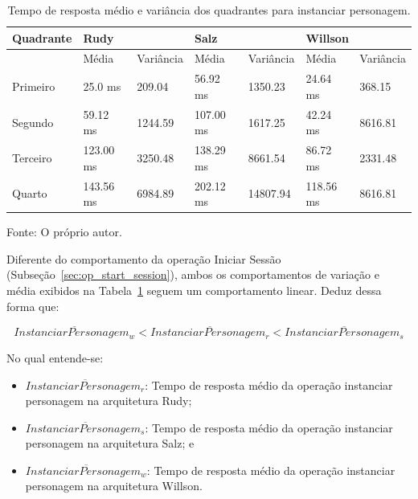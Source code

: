 \begin{table}[htb!]
\centering
\begin{adjustbox}{max width=\textwidth}
\caption{Tempo de resposta médio e variância dos quadrantes para instanciar personagem.}
\label{tab:op_spawn_character}
\begin{tabular}{l||l|l||l|l||l|l}

\hline \hline

Quadrante & \multicolumn{2}{l||}{Rudy}    & \multicolumn{2}{l||}{Salz}    & \multicolumn{2}{l}{Willson} \\ \hline \hline

& Média & Variância & Média & Variância & Média & Variância \\ \hline

Primeiro  & 25.0 ms & 209.04 & 56.92 ms & 1350.23 & 24.64 ms & 368.15 \\ \hline

Segundo  & 59.12 ms & 1244.59 & 107.00 ms & 1617.25 & 42.24 ms & 8616.81 \\ \hline

Terceiro  & 123.00 ms & 3250.48 & 138.29 ms & 8661.54 & 86.72 ms & 2331.48 \\ \hline

Quarto  & 143.56 ms & 6984.89 & 202.12 ms & 14807.94 & 118.56 ms & 8616.81 \\ \hline \hline

\end{tabular}

\end{adjustbox}

Fonte: O próprio autor.
\end{table}

Diferente do comportamento da operação Iniciar Sessão (Subseção~\ref{sec:op_start_session}), ambos os comportamentos de variação e média exibidos na Tabela~\ref{tab:op_spawn_character} seguem um comportamento linear.
%
Deduz dessa forma que:

$$
  \overline{InstanciarPersonagem_{w}} < \overline{InstanciarPersonagem_{r}} <\overline{InstanciarPersonagem_{s}}
$$

No qual entende-se:

\begin{itemize}
 \item $\overline{InstanciarPersonagem_{r}}$: Tempo de resposta médio da operação instanciar personagem na arquitetura Rudy;
 \item $\overline{InstanciarPersonagem_{s}}$: Tempo de resposta médio da operação instanciar personagem na arquitetura Salz; e
 \item $\overline{InstanciarPersonagem_{w}}$: Tempo de resposta médio da operação instanciar personagem na arquitetura Willson.
\end{itemize}



